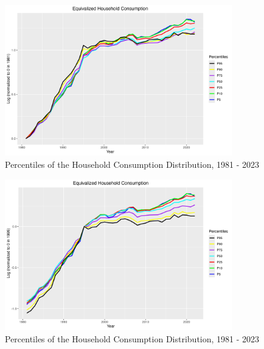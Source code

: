 \documentclass{article}
\begin{document}
\begin{appendices}
\begin{figure}[h]
    \centering
    \includegraphics[width=0.88\textwidth]{figures/Fig_7/Fig_7_percentiles_1981.png}
    \caption{Percentiles of the Household Consumption Distribution, 1981 - 2023}
    \label{fig:appendix_cyclic_consumption_1981}
\end{figure}

\begin{figure}[h]
    \centering
    \includegraphics[width=0.88\textwidth]{figures/Fig_7/Fig_7_percentiles_1995.png}
    \caption{Percentiles of the Household Consumption Distribution, 1981 - 2023}
    \label{fig:appendix_cyclic_consumption_1995}
\end{figure}

\end{appendices}
\end{document}
